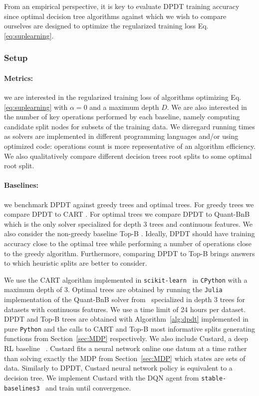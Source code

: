 From an empirical perspective, it is key to evaluate DPDT training accuracy since optimal decision tree algorithms against which we wish to compare ourselves are designed to optimize the regularized training loss Eq.\ref{eq:suplearning}.

\subsubsection{Setup}
\paragraph{Metrics:} we are interested in the regularized training loss of algorithms optimizing Eq.\ref{eq:suplearning} with $\alpha=0$ and a maximum depth $D$. We are also interested in the number of key operations performed by each baseline, namely computing candidate split nodes for subsets of the training data. We disregard running times as solvers are implemented in different programming languages and/or using optimized code: operations count is more representative of an algorithm efficiency. We also qualitatively compare different decision trees root splits to some optimal root split.
\paragraph{Baselines:} we benchmark DPDT against greedy trees and optimal trees. For greedy trees we compare DPDT to CART \cite{breiman1984classification}. For optimal trees we compare DPDT to Quant-BnB \cite{quantbnb} which is the only solver specialized for depth 3 trees and continuous features. We also consider the non-greedy baseline Top-B \cite{topk}. Ideally, DPDT should have training accuracy close to the optimal tree while performing a number of operations close to the greedy algorithm. Furthermore, comparing DPDT to Top-B brings answers to which heuristic splits are better to consider. 

We use the CART algorithm implemented in \texttt{scikit-learn}~\cite{scikit-learn} in \texttt{CPython} with a maximum depth of 3. Optimal trees are obtained by running the \texttt{Julia} implementation of the Quant-BnB solver from~\cite{quantbnb} specialized in depth 3 trees for datasets with continuous features. We use a time limit of 24 hours per dataset. 
DPDT and Top-B trees are obtained with Algorithm~\ref{alg:dpdt} implemented in pure \texttt{Python} and the calls to CART and Top-B most informative splits generating functions from Section~\ref{sec:MDP} respectively.
We also include Custard, a deep  RL baseline ~\cite{topin2021iterative}. Custard fits a neural network online one datum at a time rather than solving exactly the MDP from Section~\ref{sec:MDP} which states are sets of data. Similarly to DPDT, Custard neural network policy is equivalent to a decision tree. We implement Custard with the DQN agent from \texttt{stable-baselines3}~\cite{stable-baselines3} and train until convergence. 

